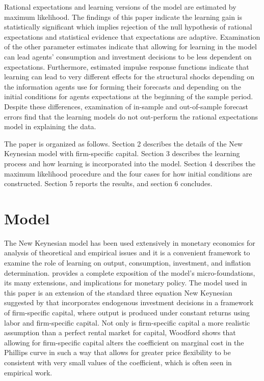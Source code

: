 Rational expectations and learning versions of the model are estimated by maximum likelihood.  The findings of this paper indicate the learning gain is statistically significant which implies rejection of the null hypothesis of rational expectations and statistical evidence that expectations are adaptive.  Examination of the other parameter estimates indicate that allowing for learning in the model can lead agents' consumption and investment decisions to be less dependent on expectations.  Furthermore, estimated impulse response functions indicate that learning can lead to very different effects for the structural shocks depending on the information agents use for forming their forecasts and depending on the initial conditions for agents expectations at the beginning of the sample period.  Despite these differences, examination of in-sample and out-of-sample forecast errors find that the learning models do not out-perform the rational expectations model in explaining the data.

The paper is organized as follows.  Section 2 describes the details of the New Keynesian model with firm-specific capital.  Section 3 describes the learning process and how learning is incorporated into the model.  Section 4 describes the maximum likelihood procedure and the four cases for how initial conditions are constructed.  Section 5 reports the results, and section 6 concludes.

\section{Model}
The New Keynesian model has been used extensively in monetary economics for analysis of theoretical and empirical issues and it is a convenient framework to examine the role of learning on output, consumption, investment, and inflation determination.   provides a complete exposition of the model's micro-foundations, its many extensions, and implications for monetary policy.  The model used in this paper is an extension of the standard three equation New Keynesian suggested by  that incorporates endogenous investment decisions in a framework of firm-specific capital, where output is produced under constant returns using labor and firm-specific capital.  Not only is firm-specific capital a more realistic assumption than a perfect rental market for capital, Woodford shows that allowing for firm-specific capital alters the coefficient on marginal cost in the Phillips curve in such a way that allows for greater price flexibility to be consistent with very small values of the coefficient, which is often seen in empirical work.  

